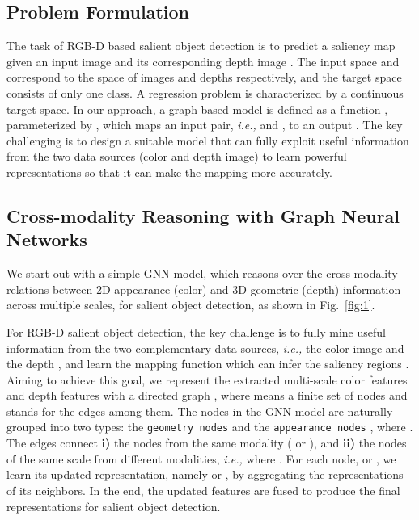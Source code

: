 \documentclass[runningheads]{llncs}
\begin{document}
	\subsection{Problem Formulation}

The task of RGB-D based salient object detection is to predict a saliency map  given an input image  and its corresponding depth image . The input space  and  correspond to the space of images and depths respectively, and the target space  consists of only one class.  A regression problem is characterized by a continuous target space. In our approach, a graph-based model is defined as a function , parameterized by , which maps an input pair, \emph{i.e.,}  and , to an output . The key challenging is to design a suitable model  that can fully exploit useful information from the two data sources (color and depth image) to learn powerful representations so that it can make the mapping more accurately. 

	\subsection{Cross-modality Reasoning with Graph Neural Networks}
		We start out with a simple GNN model, which reasons over the cross-modality relations between 2D appearance (color) and 3D geometric (depth) information across multiple scales, for salient object detection, as shown in Fig.~\ref{fig:1}.

		 For RGB-D salient object detection, the key challenge is to fully mine useful information from the two complementary data sources, \emph{i.e.,} the color image  and the depth , and learn the mapping function  which can infer the saliency regions . Aiming to achieve this goal, we represent the extracted multi-scale color features  and depth features  with a directed graph , where  means a finite set of nodes and  stands for the edges among them. The nodes in the GNN model are naturally grouped into two types: the {\tt geometry nodes}  and the {\tt appearance nodes} , where . The edges  connect {\bfseries \small i)} the nodes from the same modality ( or ), and {\bfseries \small ii)} the nodes of the same scale from different modalities, \emph{i.e.,}  where . For each node,  or , we learn its updated representation, namely  or , by aggregating the representations of its neighbors. In the end, the updated features are fused to produce the final representations for salient object detection.
\end{document}
